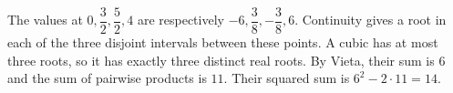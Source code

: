 The values at $0,\dfrac{3}{2},\dfrac{5}{2},4$ are respectively $-6,\dfrac{3}{8},-\dfrac{3}{8},6$. Continuity gives a root in each of the three disjoint intervals between these points. A cubic has at most three roots, so it has exactly three distinct real roots. By Vieta, their sum is $6$ and the sum of pairwise products is $11$. Their squared sum is $6^2-2\cdot11=\boxed{14}$.
